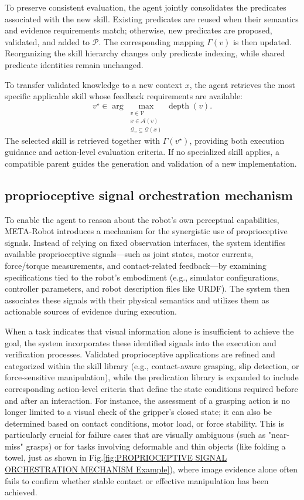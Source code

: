 \documentclass{article} %
\begin{document}
To preserve consistent evaluation, the agent jointly consolidates the predicates associated with the new skill. Existing predicates are reused when their semantics and evidence requirements match; otherwise, new predicates are proposed, validated, and added to $\mathcal{P}$. The corresponding mapping $\Gamma(v)$ is then updated. Reorganizing the skill hierarchy changes only predicate indexing, while shared predicate identities remain unchanged.

To transfer validated knowledge to a new context $x$, the agent retrieves the most specific applicable skill whose feedback requirements are available:
\begin{equation}
v^\star \in
\arg\max_{\substack{
v\in\mathcal{V}\\
x\in\mathcal{A}(v)\\
\mathcal{Q}_v\subseteq\mathcal{Q}(x)
}}
\operatorname{depth}(v).
\label{eq:skill_retrieval}
\end{equation}
The selected skill is retrieved together with $\Gamma(v^\star)$, providing both execution guidance and action-level evaluation criteria. If no specialized skill applies, a compatible parent guides the generation and validation of a new implementation.
\subsection{proprioceptive signal orchestration mechanism  }
To enable the agent to reason about the robot's own perceptual capabilities, META-Robot introduces a mechanism for the synergistic use of proprioceptive signals. Instead of relying on fixed observation interfaces, the system identifies available proprioceptive signals—such as joint states, motor currents, force/torque measurements, and contact-related feedback—by examining specifications tied to the robot's embodiment (e.g., simulator configurations, controller parameters, and robot description files like URDF). The system then associates these signals with their physical semantics and utilizes them as actionable sources of evidence during execution.

When a task indicates that visual information alone is insufficient to achieve the goal, the system incorporates these identified signals into the execution and verification processes. Validated proprioceptive applications are refined and categorized within the skill library (e.g., contact-aware grasping, slip detection, or force-sensitive manipulation), while the predication library is expanded to include corresponding action-level criteria that define the state conditions required before and after an interaction. For instance, the assessment of a grasping action is no longer limited to a visual check of the gripper's closed state; it can also be determined based on contact conditions, motor load, or force stability. This is particularly crucial for failure cases that are visually ambiguous (such as "near-miss" grasps) or for tasks involving deformable and thin objects (like folding a towel, just as shown in Fig.\ref{fig:PROPRIOCEPTIVE SIGNAL ORCHESTRATION MECHANISM Example}), where image evidence alone often fails to confirm whether stable contact or effective manipulation has been achieved.
\end{document}
